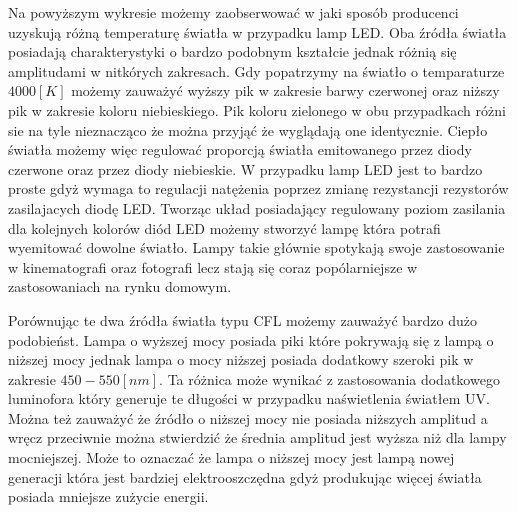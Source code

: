\documentclass[11pt]{article}
\begin{document}
    \noindent{}
    \indent Na powyższym wykresie możemy zaobserwować w jaki sposób producenci uzyskują różną temperaturę światła
    w przypadku lamp LED. Oba źródła światła posiadają charakterystyki o bardzo podobnym kształcie jednak różnią się amplitudami
    w nitkórych zakresach. Gdy popatrzymy na światło o temparaturze $4000[K]$ możemy zauważyć wyższy pik w zakresie barwy czerwonej
    oraz niższy pik w zakresie koloru niebieskiego. Pik koloru zielonego w obu przypadkach różni sie na tyle nieznacząco że można przyjąć
    że wyglądają one identycznie. Ciepło światła możemy więc regulować proporcją światła emitowanego przez diody czerwone oraz przez diody
    niebieskie. W przypadku lamp LED jest to bardzo proste gdyż wymaga to regulacji natężenia poprzez zmianę rezystancji rezystorów zasilajacych
    diodę LED. Tworząc układ posiadający regulowany poziom zasilania dla kolejnych kolorów diód LED możemy stworzyć lampę która potrafi wyemitować
    dowolne światło. Lampy takie głównie spotykają swoje zastosowanie w kinematografi oraz fotografi lecz stają się coraz popólarniejsze w
    zastosowaniach na rynku domowym.

    \noindent{}
    \justifying Porównując te dwa źródła światła typu CFL możemy zauważyć bardzo dużo podobieńst. Lampa o wyższej mocy posiada
    piki które pokrywają się z lampą o niższej mocy jednak lampa o mocy niższej posiada dodatkowy szeroki pik w zakresie $450-550[nm]$.
    Ta różnica może wynikać z zastosowania dodatkowego luminofora który generuje te długości w przypadku naświetlenia światłem UV.
    Można też zauważyć że źródło o niższej mocy nie posiada niższych amplitud a wręcz przeciwnie można stwierdzić że średnia amplitud
    jest wyższa niż dla lampy mocniejszej. Może to oznaczać że lampa o niższej mocy jest lampą nowej generacji która jest bardziej elektrooszczędna
    gdyż produkując więcej światła posiada mniejsze zużycie energii.
\end{document}
